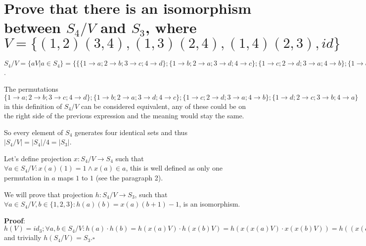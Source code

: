 \documentclass[11pt]{article}
\begin{document}
    \part*{Prove that there is an isomorphism between $S_4 / V$ and $S_3$, where $V = \{(1, 2)(3, 4), (1,3)(2,4), (1,4)(2,3), id\}$}

    $S_4 / V = \{aV | a \in S_4\} = \{\{\{1 \rightarrow a; 2 \rightarrow b; 3 \rightarrow c; 4 \rightarrow d\}; \{1 \rightarrow b; 2 \rightarrow a; 3 \rightarrow d; 4 \rightarrow c\}; \{1 \rightarrow c; 2 \rightarrow d; 3 \rightarrow a; 4 \rightarrow b\}; \{1 \rightarrow d; 2 \rightarrow c; 3 \rightarrow b; 4 \rightarrow a\} | \{1 \rightarrow a;2 \rightarrow b;3 \rightarrow c;4 \rightarrow d\}\} \in S_4\}$.

    The permutations $\{1 \rightarrow a; 2 \rightarrow b; 3 \rightarrow c; 4 \rightarrow d\}; \{1 \rightarrow b; 2 \rightarrow a; 3 \rightarrow d; 4 \rightarrow c\}; \{1 \rightarrow c; 2 \rightarrow d; 3 \rightarrow a; 4 \rightarrow b\}; \{1 \rightarrow d; 2 \rightarrow c; 3 \rightarrow b; 4 \rightarrow a\}$ in this definition of $S_4 / V$ can be considered equivalent, any of these could be on the right side of the previous expression and the meaning would stay the same.

    So every element of $S_4$ generates four identical sets and thus $|S_4 / V| = |S_4| / 4 = |S_3|$.

    Let's define projection $x: S_4 / V \rightarrow S_4$ such that $\forall a \in S_4 / V: x(a)(1) = 1 \wedge x(a) \in a$, this is well defined as only one permutation in $a$ maps $1$ to $1$ (see the paragraph 2).

    We will prove that projection $h: S_4 / V \rightarrow S_3$, such that $\forall a \in S_4 / V, b \in \{1,2,3\}: h(a)(b) = x(a)(b + 1) - 1$, is an isomorphism.

    \textbf{Proof}: $h(V) = id_3; \forall a, b \in S_4 / V: h(a) \cdot h(b) = h(x(a) V) \cdot h(x(b) V) = h(x(x(a) V) \cdot x(x(b) V)) = h((x(a) \cdot x(b))V) = h(x(a \cdot b)V) = h(a \cdot b)$ and trivially $h(S_4 / V) = S_3. \square$
\end{document}
